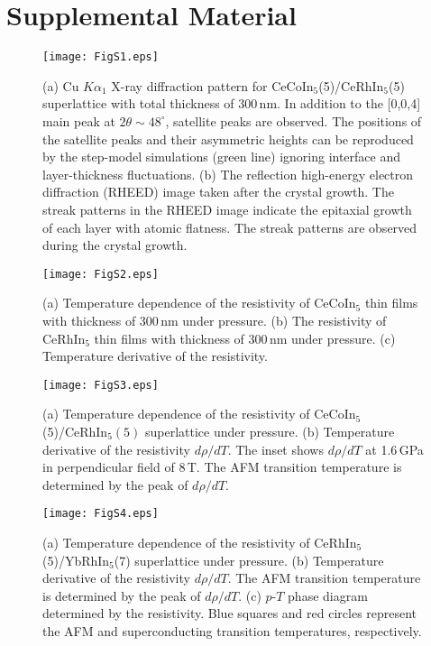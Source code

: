 \documentclass[twocolumn,preprintnumbers,amsmath,amssymb,prl]{revtex4}
\begin{document}
\clearpage

\renewcommand{\thefigure}{S\arabic{figure}}
\setcounter{figure}{0}

\section*{Supplemental Material}

\begin{figure}[h]
	\texttt{[image: FigS1.eps]}
	\caption{(a) Cu $K\alpha_1$ X-ray diffraction pattern for CeCoIn$_5$(5)/CeRhIn$_5$(5) superlattice with total thickness of 300\,nm.  In addition to the [0,0,4] main peak at $2\theta\sim48^{\circ}$,  satellite peaks are observed.  The positions of the satellite peaks and their asymmetric heights can be reproduced by the step-model simulations (green line) ignoring interface and layer-thickness fluctuations.  (b)  The reflection high-energy electron diffraction (RHEED) image taken after the crystal growth.   The streak patterns in the RHEED image indicate the epitaxial growth of each layer with atomic flatness. The streak patterns are observed during the crystal growth. }
\end{figure}


\newpage

\begin{figure}[t]
	\texttt{[image: FigS2.eps]}
	\caption{(a) Temperature dependence of the resistivity of CeCoIn$_5$ thin films with thickness of 300\,nm under pressure.  (b) The resistivity of CeRhIn$_5$ thin films with thickness of 300\,nm under pressure.  (c) Temperature derivative of the resistivity.  }
\end{figure}


\newpage

\begin{figure}[t]
	\texttt{[image: FigS3.eps]}
	\caption{(a) Temperature dependence of the resistivity of CeCoIn$_5$(5)/CeRhIn$_5(5)$ superlattice under pressure. (b) Temperature derivative of the resistivity $d\rho/dT$. The inset shows $d\rho/dT$ at 1.6\,GPa  in perpendicular field of 8\,T.  The AFM transition temperature is determined by the peak of $d\rho/dT$.}
\end{figure}


\newpage

\begin{figure}[h]
	\texttt{[image: FigS4.eps]}
	\caption{(a) Temperature dependence of the resistivity of  CeRhIn$_5$(5)/YbRhIn$_5$(7) superlattice under pressure. (b) Temperature derivative of the resistivity $d\rho/dT$. The AFM transition temperature is determined by the peak of $d\rho/dT$. (c) $p$-$T$ phase diagram determined by the resistivity. Blue squares and red circles represent the AFM and superconducting transition temperatures, respectively.   }
\end{figure}
\end{document}
